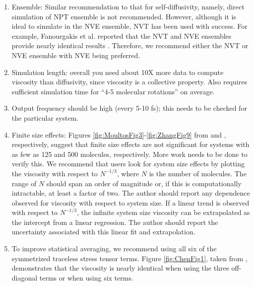 \documentclass[9pt]{livecoms}
\begin{document}
\begin{enumerate}
	\item Ensemble: Similar recommendation to that for self-diffusivity, namely, direct simulation of NPT ensemble is not recommended. However, although it is ideal to simulate in the NVE ensemble, NVT has been used with success. For example, Fanourgakis et al. reported that the NVT and NVE ensembles provide nearly identical results \cite{Fanourgakis2012}. Therefore, we recommend either the NVT or NVE ensemble with NVE being preferred.
	\item Simulation length: overall you need about 10X more data to compute viscosity than diffusivity, since viscosity is a collective property. Also requires sufficient simulation time for “4-5 molecular rotations” on average. 
	\item Output frequency should be high (every 5-10 fs); this needs to be checked for the particular system. 
	\item Finite size effects: Figures \ref{fig:MoultosFig3}-\ref{fig:ZhangFig9} from \cite{Moultos2016} and \cite{Zhang2015}, respectively, suggest that finite size effects are not significant for systems with as few as 125 and 500 molecules, respectively. More work needs to be done to verify this. We recommend that users look for system size effects by plotting the viscosity with respect to $N^{-1/3}$, where $N$ is the number of molecules. The range of $N$ should span an order of magnitude or, if this is computationally intractable, at least a factor of two. The author should report any dependence observed for viscosity with respect to system size. If a linear trend is observed with respect to $N^{-1/3}$, the infinite system size viscosity can be extrapolated as the intercept from a linear regression. The author should report the uncertainty associated with this linear fit and extrapolation.
	\item To improve statistical averaging, we recommend using all six of the symmetrized traceless stress tensor terms. Figure \ref{fig:ChenFig1}, taken from \cite{Chen2009}, demonstrates that the viscosity is nearly identical when using the three off-diagonal terms or when using six terms. 

\end{enumerate}
\end{document}
